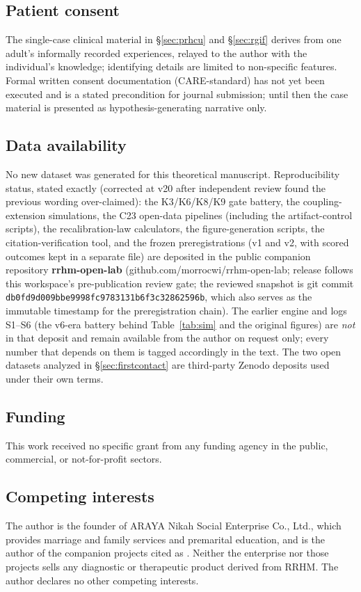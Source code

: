 \documentclass[9pt,twocolumn]{article}
\begin{document}
\subsection*{Patient consent}
The single-case clinical material in \S\ref{sec:prhcu} and \S\ref{sec:rgif} derives from one adult's informally recorded experiences, relayed to the author with the individual's knowledge; identifying details are limited to non-specific features. Formal written consent documentation (CARE-standard) has not yet been executed and is a stated precondition for journal submission; until then the case material is presented as hypothesis-generating narrative only.

\subsection*{Data availability}
No new dataset was generated for this theoretical manuscript. Reproducibility status, stated exactly (corrected at v20 after independent review found the previous wording over-claimed): the K3/K6/K8/K9 gate battery, the coupling-extension simulations, the C23 open-data pipelines (including the artifact-control scripts), the recalibration-law calculators, the figure-generation scripts, the citation-verification tool, and the frozen preregistrations (v1 and v2, with scored outcomes kept in a separate file) are deposited in the public companion repository \textbf{rrhm-open-lab} (github.com/morrocwi/rrhm-open-lab; release follows this workspace's pre-publication review gate; the reviewed snapshot is git commit \texttt{db0fd9d009bbe9998fc9783131b6f3c32862596b}, which also serves as the immutable timestamp for the preregistration chain). The earlier engine and logs S1--S6 (the v6-era battery behind Table~\ref{tab:sim} and the original figures) are \emph{not} in that deposit and remain available from the author on request only; every number that depends on them is tagged accordingly in the text. The two open datasets analyzed in \S\ref{sec:firstcontact} are third-party Zenodo deposits used under their own terms.

\subsection*{Funding}
This work received no specific grant from any funding agency in the public, commercial, or not-for-profit sectors.

\subsection*{Competing interests}
The author is the founder of ARAYA Nikah Social Enterprise Co., Ltd., which provides marriage and family services and premarital education, and is the author of the companion projects cited as \cite{lahtee2026ru,lahtee2026rc,lahtee2026birca,lahtee2026srct}. Neither the enterprise nor those projects sells any diagnostic or therapeutic product derived from RRHM. The author declares no other competing interests.
\end{document}
